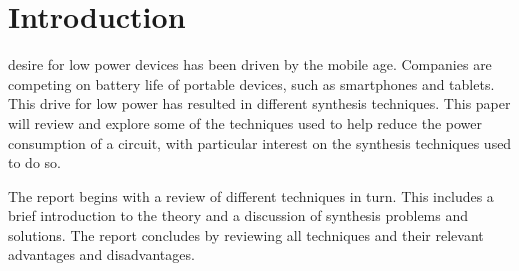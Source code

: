 

\section{Introduction}
 desire for low power devices has been driven by the mobile age.
Companies are competing on battery life of portable devices, such as smartphones and tablets.
This drive for low power has resulted in different synthesis techniques.
This paper will review and explore some of the techniques used to help reduce the power consumption of a circuit, with particular interest on the synthesis techniques used to do so.

The report begins with a review of different techniques in turn. 
This includes a brief introduction to the theory and a discussion of synthesis problems and solutions.
The report concludes by reviewing all techniques and their relevant advantages and disadvantages. 


